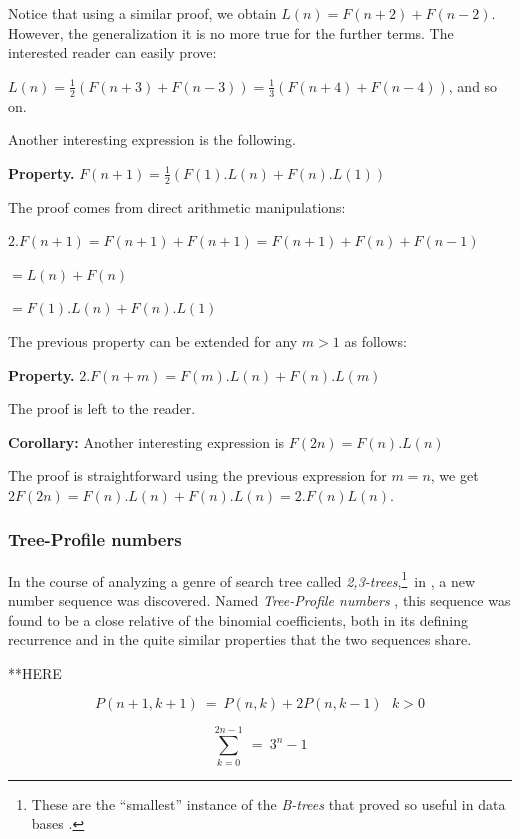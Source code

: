 Notice that using a similar proof, we obtain $L(n) = F(n+2)+F(n-2)$. 
However, the generalization it is no more true for the further terms.
The interested reader can easily prove:

$L(n) = \frac{1}{2} (F(n+3)+F(n-3))= \frac{1}{3} (F(n+4)+F(n-4))$, and so on.
\medskip

Another interesting expression is the following.

\noindent \textbf{Property. } 
\label{prop:Lucas2}
$F(n+1) = \frac{1}{2} (F(1).L(n) + F(n).L(1))$


\medskip
The proof comes from direct arithmetic manipulations:

$2.F(n+1) = F(n+1) +  F(n+1) =  F(n+1) + F(n) + F(n-1)$

$= L(n) + F(n) $

$= F(1).L(n) + F(n).L(1)$
\medskip


The previous property can be extended for any $m>1$ as follows:

\noindent \textbf{Property. } 
\label{prop:Lucas3}
$2.F(n+m) = F(m).L(n) + F(n).L(m)$

The proof is left to the reader.

\bigskip

\noindent \textbf{Corollary:} Another interesting expression is
$F(2n) = F(n).L(n)$

The proof is straightforward using the previous expression for $m=n$, we get $2F(2n) = F(n).L(n) + F(n).L(n) = 2.F(n)L(n)$.


\subsubsection{Tree-Profile numbers}
\label{sec:Tree-Profile-numbers}

In the course of analyzing a genre of search tree called {\it
  2,3-trees},\footnote{These are the ``smallest'' instance of the {\it
    B-trees} that proved so useful in data bases \cite{CLRS}.}~in
\cite{MillerPRS79,RosenbergS78}, a new number sequence was discovered.
Named {\it Tree-Profile numbers} \cite{Rosenberg79}, this sequence was
found to be a close relative of the binomial coefficients, both in its
defining recurrence and in the quite similar properties that the two
sequences share.

**HERE

\[ P(n+1, k+1) \ = \ P(n,k) + 2 P(n, k-1) \ \ \ k>0 \]

\[ \sum_{k=0}^{2n-1} \ = \ 3^n -1 \]

